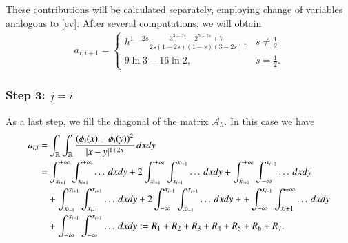 These contributions will be calculated separately, employing change of variables analogous to \eqref{cv}. After several computations, we will obtain
\begin{align}\label{Aii1}
	a_{i,i+1} = \begin{cases}
					\displaystyle h^{1-2s}\frac{3^{3-2s}-2^{5-2s}+7}{2s(1-2s)(1-s)(3-2s)}, & \displaystyle s\neq \frac{1}{2}
					\\
					9\ln 3-16\ln 2, & \displaystyle s=\frac{1}{2}.
				\end{cases}	
\end{align}

\subsubsection*{Step 3: $j= i$}
As a last step, we fill the diagonal of the matrix $\mathcal A_h$. In this case we have
	\begin{align*}
	a_{i,i}= & \int_{\mathbb{R}}\int_{\mathbb{R}}\frac{(\phi_i(x)-\phi_i(y))^2}{|x-y|^{1+2s}}\,dxdy
	\\
	= & \int_{x_{i+1}}^{+\infty}\int_{x_{i+1}}^{+\infty} \ldots\,dxdy + 2\int_{x_{i+1}}^{+\infty}\int_{x_{i-1}}^{x_{i+1}} \ldots\,dxdy + \int_{x_{i+1}}^{+\infty}\int_{-\infty}^{x_{i-1}} \ldots\,dxdy 
	\\
	& + \int_{x_{i-1}}^{x_{i+1}}\int_{x_{i-1}}^{x_{i+1}} \ldots\,dxdy + 2\int_{-\infty}^{x_{i-1}}\int_{x_{i-1}}^{x_{i+1}} \ldots\,dxdy + + \int_{-\infty}^{x_{i-1}}\int_{x{i+1}}^{+\infty} \ldots\,dxdy 
	\\
	& +  \int_{-\infty}^{x_{i-1}}\int_{-\infty}^{x_{i-1}} \ldots\,dxdy := R_1 + R_2 + R_3 + R_4 + R_5 + R_6 + R_7.
\end{align*}

